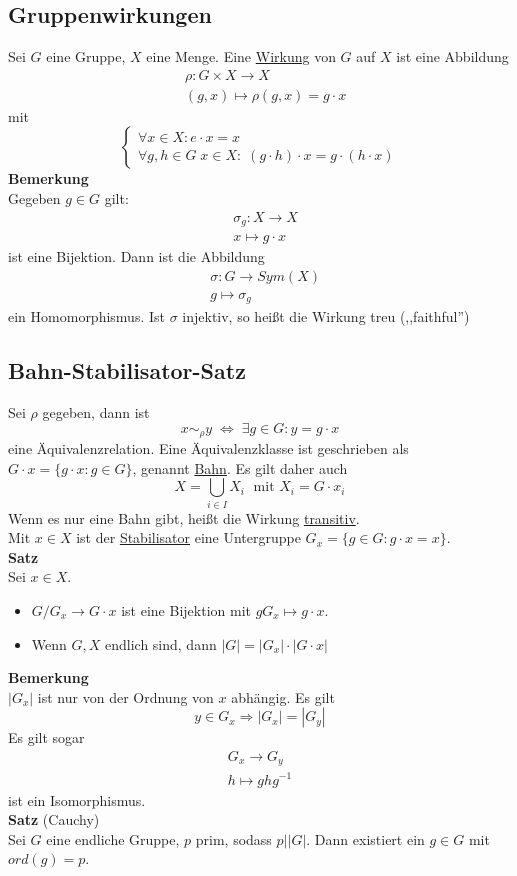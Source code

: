 \documentclass[a4paper, 12pt]{article}
\begin{document}
\subsection{Gruppenwirkungen}
Sei $G$ eine Gruppe, $X$ eine Menge. Eine \underline{Wirkung} von $G$ auf $X$ ist eine Abbildung \begin{eqnarray*}
	&\rho: G\times X \to X\\
	&(g,x) \mapsto \rho(g,x) = g\cdot x
\end{eqnarray*}
mit \[\begin{cases}
	\forall x \in X: e\cdot x = x\\
	\forall g,h \in G\; x\in X: \; (g\cdot h)\cdot x = g\cdot (h\cdot x)
\end{cases}\]
\textbf{Bemerkung}\\
Gegeben $g \in G$ gilt: \begin{eqnarray*}
	&\sigma_g: X \to X\\
	&x \mapsto g\cdot x
\end{eqnarray*} ist eine Bijektion.
Dann ist die Abbildung \begin{eqnarray*}
	&\sigma: G \to Sym(X)\\
	&g \mapsto \sigma_g
\end{eqnarray*} ein Homomorphismus. Ist $\sigma$ injektiv, so heißt die Wirkung treu (,,faithful'')
\subsection{Bahn-Stabilisator-Satz}
Sei $\rho$ gegeben, dann ist \[x\sim_\rho y \;\Leftrightarrow \; \exists g \in G: y=g\cdot x\] eine Äquivalenzrelation. Eine Äquivalenzklasse ist geschrieben als $G\cdot x = \{g\cdot x: g \in G\}$, genannt \underline{Bahn}. Es gilt daher auch \[X = \bigcup_{i \in I} X_i \;\text{ mit } X_i = G\cdot x_i\] Wenn es nur eine Bahn gibt, heißt die Wirkung \underline{transitiv}.\\
Mit $x \in X$ ist der \underline{Stabilisator} eine Untergruppe $G_x = \{g \in G: g\cdot x = x\}$.\\
\textbf{Satz}\\
Sei $x \in X$. \begin{itemize}
	\item $G/G_x \to G\cdot x$ ist eine Bijektion mit $gG_x \mapsto g\cdot x$.
	\item Wenn $G,X$ endlich sind, dann $\left|G\right| = \left|G_x\right|\cdot \left|G\cdot x\right|$
\end{itemize}
\textbf{Bemerkung}\\
$\left|G_x\right|$ ist nur von der Ordnung von $x$ abhängig. Es gilt \[y \in G_x \Rightarrow \left|G_x\right| = \left|G_y\right|\]
Es gilt sogar \begin{eqnarray*}
	G_x \to G_y\\
	h \mapsto ghg^{-1}
\end{eqnarray*} ist ein Isomorphismus.\\
\textbf{Satz} (Cauchy)\\
Sei $G$ eine endliche Gruppe, $p$ prim, sodass $p | \left|G\right|$. Dann existiert ein $g \in G$ mit $ord(g) = p$.
\end{document}
